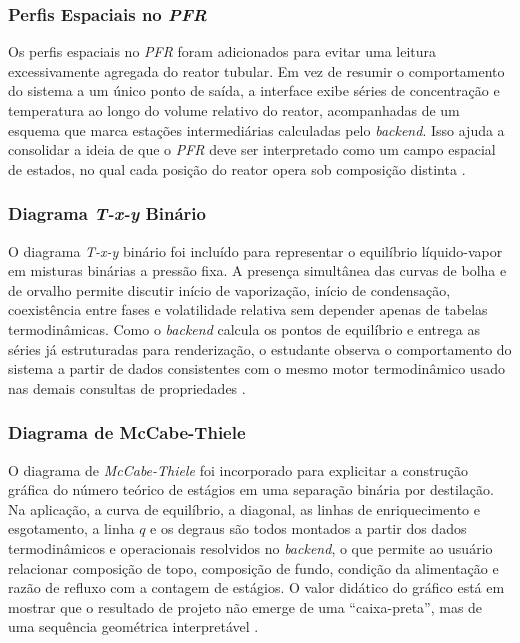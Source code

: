 \subsubsection{Perfis Espaciais no \textit{PFR}}

Os perfis espaciais no \textit{PFR} foram adicionados para evitar uma leitura excessivamente agregada do reator tubular. Em vez de resumir o comportamento do sistema a um único ponto de saída, a interface exibe séries de concentração e temperatura ao longo do volume relativo do reator, acompanhadas de um esquema que marca estações intermediárias calculadas pelo \textit{backend}. Isso ajuda a consolidar a ideia de que o \textit{PFR} deve ser interpretado como um campo espacial de estados, no qual cada posição do reator opera sob composição distinta \cite{fogler2009,levenspiel2000}.

\subsubsection{Diagrama \textit{T-x-y} Binário}

O diagrama \textit{T-x-y} binário foi incluído para representar o equilíbrio líquido-vapor em misturas binárias a pressão fixa. A presença simultânea das curvas de bolha e de orvalho permite discutir início de vaporização, início de condensação, coexistência entre fases e volatilidade relativa sem depender apenas de tabelas termodinâmicas. Como o \textit{backend} calcula os pontos de equilíbrio e entrega as séries já estruturadas para renderização, o estudante observa o comportamento do sistema a partir de dados consistentes com o mesmo motor termodinâmico usado nas demais consultas de propriedades \cite{smith2018}.

\subsubsection{Diagrama de McCabe-Thiele}

O diagrama de \textit{McCabe-Thiele} foi incorporado para explicitar a construção gráfica do número teórico de estágios em uma separação binária por destilação. Na aplicação, a curva de equilíbrio, a diagonal, as linhas de enriquecimento e esgotamento, a linha $q$ e os degraus são todos montados a partir dos dados termodinâmicos e operacionais resolvidos no \textit{backend}, o que permite ao usuário relacionar composição de topo, composição de fundo, condição da alimentação e razão de refluxo com a contagem de estágios. O valor didático do gráfico está em mostrar que o resultado de projeto não emerge de uma ``caixa-preta'', mas de uma sequência geométrica interpretável \cite{mccabe2005,smith2018}.

